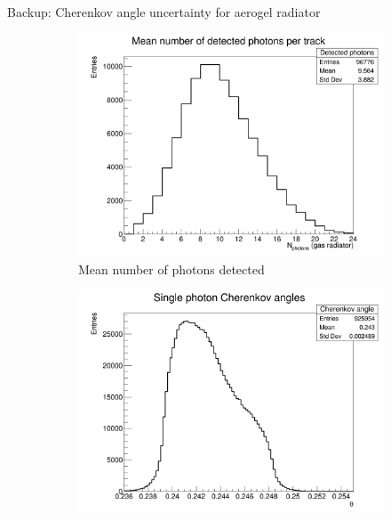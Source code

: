 \documentclass{beamer}
\begin{document}
\begin{frame}{Backup: Cherenkov angle uncertainty for aerogel radiator}
  \begin{figure}
    \centering
    \vspace{-0.2cm}
    \begin{subfigure}{0.35\textwidth}
      \includegraphics[width = 1.0\textwidth]{Plots/NumberDetectedPhotons_Barrel_Aerogel.png}
      \vspace{-0.75cm}
      \caption{Mean number of photons detected}
    \end{subfigure}
    \begin{subfigure}{0.35\textwidth}
      \includegraphics[width = 1.0\textwidth]{Plots/SinglePhotonCherenkovAngles_Barrel_Aerogel.png}
      \vspace{-0.75cm}

\end{subfigure}
\end{figure}
\end{frame}
\end{document}
